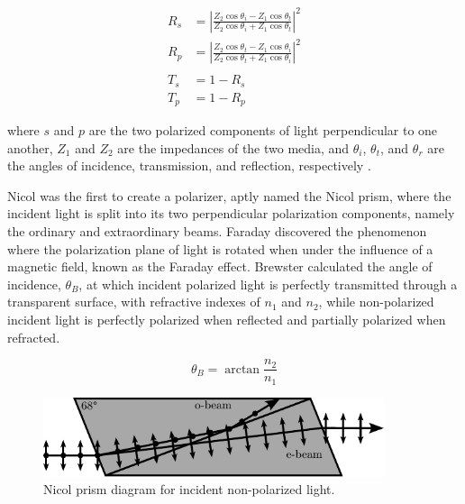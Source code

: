 \begin{align}
    R_{s} &= \left\lvert \frac{Z_{2} \cos{\theta_{i}} - Z_{1} \cos{\theta_{t}}}{Z_{2} \cos{\theta_{i}} + Z_{1} \cos{\theta_{t}}} \right\rvert^{2} \nonumber \\
    R_{p} &= \left\lvert \frac{Z_{2} \cos{\theta_{t}} - Z_{1} \cos{\theta_{i}}}{Z_{2} \cos{\theta_{t}} + Z_{1} \cos{\theta_{i}}} \right\rvert^{2} \nonumber \\
    \label{eq:Fresnel} \\
    T_{s} &= 1 - R_{s} \nonumber \\
    T_{p} &= 1 - R_{p} \nonumber
\end{align}

\noindent where $s$ and $p$ are the two polarized components of light perpendicular to one another, $Z_{1}$ and $Z_{2}$ are the impedances of the two media, and $\theta_{i}$, $\theta_{t}$, and $\theta_{r}$ are the angles of incidence, transmission, and reflection, respectively \citep{Fresnel}.
\prgph

Nicol was the first to create a polarizer, aptly named the Nicol prism, where the incident light is split into its two perpendicular polarization components, namely the ordinary and extraordinary beams. Faraday discovered the phenomenon where the polarization plane of light is rotated when under the influence of a magnetic field, known as the Faraday effect. Brewster calculated the angle of incidence, $\theta_{B}$, at which incident polarized light is perfectly transmitted through a transparent surface, with refractive indexes of $n_{1}$ and $n_{2}$, while non-polarized incident light is perfectly polarized when reflected and partially polarized when refracted.

\begin{equation}
        \theta_{B} = \arctan{\frac{n_{2}}{n_{1}}}
        \label{eq:Brewster}
\end{equation}

\begin{figure}
    \centering
    \includegraphics[width=10cm]{figures/2_Nicol_prism.pdf}
    \caption{Nicol prism diagram for incident non-polarized light.}
    \label{fig:Nicol_prism}
\end{figure}

